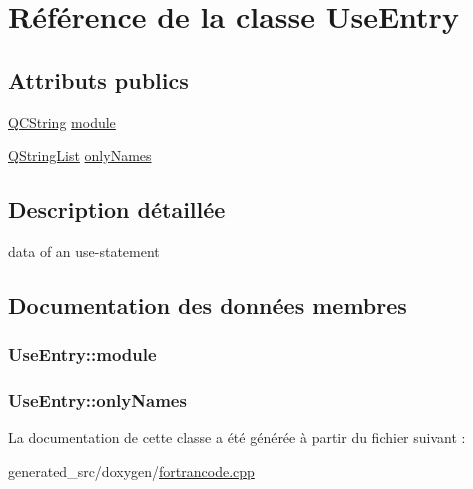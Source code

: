 \hypertarget{class_use_entry}{}\section{Référence de la classe Use\+Entry}
\label{class_use_entry}
\subsection*{Attributs publics}
\begin{DoxyCompactItemize}
\item 
\hyperlink{class_q_c_string}{Q\+C\+String} \hyperlink{class_use_entry_a84f8f457213f3f11338ad766412dbb4b}{module}
\item 
\hyperlink{class_q_string_list}{Q\+String\+List} \hyperlink{class_use_entry_a87db1381ae8d632d3ab904a10e0dd5c1}{only\+Names}
\end{DoxyCompactItemize}


\subsection{Description détaillée}
data of an use-\/statement 

\subsection{Documentation des données membres}
\hypertarget{class_use_entry_a84f8f457213f3f11338ad766412dbb4b}{}
\subsubsection[{module}]{ Use\+Entry\+::module}\label{class_use_entry_a84f8f457213f3f11338ad766412dbb4b}
\hypertarget{class_use_entry_a87db1381ae8d632d3ab904a10e0dd5c1}{}
\subsubsection[{only\+Names}]{ Use\+Entry\+::only\+Names}\label{class_use_entry_a87db1381ae8d632d3ab904a10e0dd5c1}


La documentation de cette classe a été générée à partir du fichier suivant \+:\begin{DoxyCompactItemize}
\item 
generated\+\_\+src/doxygen/\hyperlink{fortrancode_8cpp}{fortrancode.\+cpp}\end{DoxyCompactItemize}
